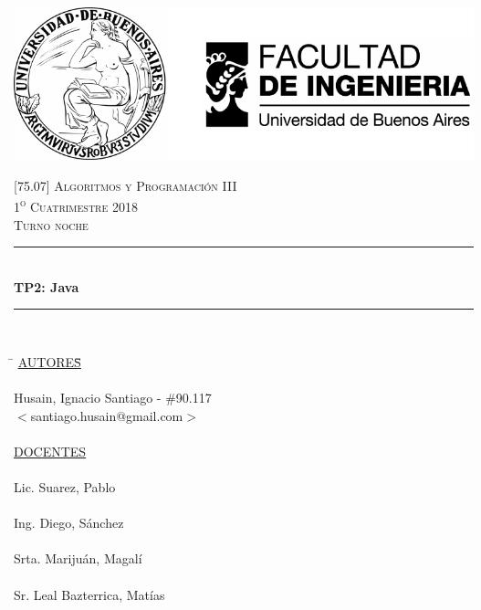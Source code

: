 

\pagestyle{fancy}
\begin{titlepage}
	\newcommand{\HRule}{\rule{\linewidth}{0.5mm}} %
	\center %
	
	\thispagestyle{empty}
	\begin{center}
		\includegraphics[scale=1]{includes/banner_fiuba.pdf}\\
	\end{center}

	
	\textsc{\LARGE \textsc{[75.07] Algoritmos y Programación III}}\\[1.5cm]
	\textsc{\large 1\textsuperscript{o} Cuatrimestre 2018}\\[0.5cm]
	\textsc{\large Turno noche}\\[0.5cm]
	
	\HRule\\[0.5cm]
	{\huge\bfseries TP2: Java}\\[0.2cm]
	\HRule\\[1.5cm]
	
	\begin{tabbing}
		\hspace{2cm}\=\+
		\underline{AUTORES}\hspace{-1cm}\=\+\hspace{1cm}\=\hspace{6cm}\=\\
		\\
		Husain, Ignacio Santiago	\>\>- \#90.117\\
		\>\footnotesize{$<$santiago.husain@gmail.com$>$}\\
		\\
		\<\underline{DOCENTES}\\
		\\
		Lic. Suarez, Pablo \\
		\\
		Ing. Diego, Sánchez \\
		\\
		Srta. Marijuán, Magalí\\
		\\
		Sr. Leal Bazterrica, Matías
	\end{tabbing}


\end{titlepage}
